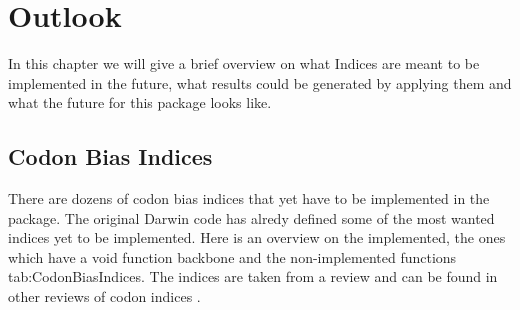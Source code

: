 \chapter{Outlook}
In this chapter we will give a brief overview on what Indices are meant to be implemented in the future, what results could be generated by applying them and what the future for this package looks like. 


\section{Codon Bias Indices}
There are dozens of codon bias indices that yet have to be implemented in the package. The original Darwin code has alredy defined some of the most wanted indices yet to be implemented. 
Here is an overview on the implemented, the ones which have a void function backbone and the non-implemented functions {tab:CodonBiasIndices}. The indices are taken from a review \cite{BinderCh13} and can be found in other reviews of codon indices \cite{Jansen2003}.

